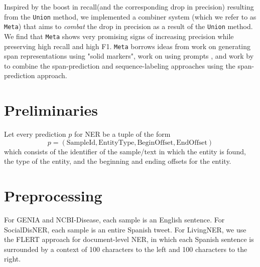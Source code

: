 \documentclass[11pt]{article}
\begin{document}
\par Inspired by the boost in recall(and the corresponding drop in precision) resulting from the \texttt{Union} method, we implemented a combiner system
(which we refer to as \texttt{Meta}) that aims to \textit{combat} the drop in precision as a result of the \texttt{Union} method. We find that \texttt{Meta} shows very promising signs of increasing precision while preserving high recall and high F1. \texttt{Meta} borrows ideas from work on generating span representations using "solid markers"\cite{baldini-soares-etal-2019-matching, xiao-etal-2020-denoising, ye-etal-2022-packed}, work on using prompts
\cite{li-etal-2020-unified}, and work by \cite{spanner} to combine the span-prediction and sequence-labeling approaches using the span-prediction approach.


\section{Preliminaries}\label{prelims}
 Let every prediction $p$ for NER be a tuple of the form $$p = (\text{SampleId}, \text{EntityType}, \text{BeginOffset}, \text{EndOffset})$$ which consists of the identifier of the sample/text in which the entity is found, the type of the entity, and the beginning and ending offsets for the entity.

\section{Preprocessing}
For GENIA and NCBI-Disease, each sample is an English sentence. For SocialDisNER, each sample is an entire Spanish tweet. For LivingNER, we use the FLERT\cite{schweter2020flert} approach for document-level NER, in which each Spanish sentence is surrounded by a context of 100 characters to the left and 100 characters to the right.
\end{document}
